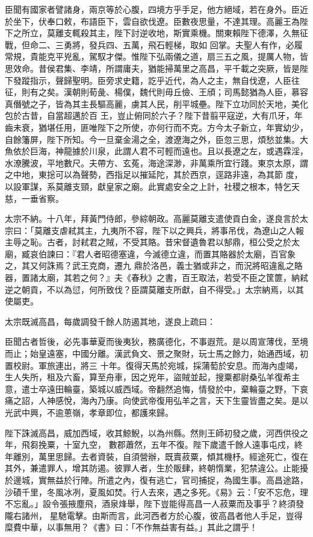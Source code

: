 \begin{pinyinscope}
 臣聞有國家者譬諸身，兩京等於心腹，四境方乎手足，他方絕域，若在身外。臣近於坐下，伏奉口敕，布語臣下，雲自欲伐遼。臣數夜思量，不達其理。高麗王為陛下之所立，莫離支輒殺其主，陛下討逆收地，斯實乘機。關東賴陛下德澤，久無征戰，但命二、三勇將，發兵四、五萬，飛石輕梯，取如
 回掌。夫聖人有作，必履常規，貴能克平兇亂，駕馭才傑。惟陛下弘兩儀之道，扇三五之風，提厲人物，皆思效命。昔侯君集、李靖，所謂庸夫，猶能掃萬里之高昌，平千載之突厥，皆是陛下發蹤指示，聲歸聖明。臣旁求史籍，訖乎近代，為人之主，無自伐遼，人臣往征，則有之矣。漢朝則荀彘、楊僕，魏代則毋丘儉、王頎；司馬懿猶為人臣，慕容真僭號之子，皆為其主長驅高麗，虜其人民，削平城壘。陛下立功同於天地，美化包於古昔，自當超邁於百
 王，豈止俯同於六子？陛下昔翦平寇逆，大有爪牙，年齒未衰，猶堪任用，匪唯陛下之所使，亦何行而不克。方今太子新立，年實幼少，自餘籓屏，陛下所知。今一旦棄金湯之全，渡遼海之外，臣忽三思，煩愁並集。大魚依於巨海，神龍據於川泉，此謂人君不可輕而遠也。且以長遼之左，或遇霖淫，水潦騰波，平地數尺。夫帶方、玄菟，海途深渺，非萬乘所宜行踐。東京太原，謂之中地，東捴可以為聲勢，西指足以摧延陀，其於西京，逕路非遠，為其節
 度，以設軍謀，系莫離支頸，獻皇家之廟。此實處安全之上計，社稷之根本，特乞天慈，一垂省察。



 太宗不納。十八年，拜黃門侍郎，參綜朝政。高麗莫離支遣使貢白金，遂良言於太宗曰：「莫離支虐弒其主，九夷所不容，陛下以之興兵，將事吊伐，為遼山之人報主辱之恥。古者，討弒君之賊，不受其賂。昔宋督遺魯君以郜鼎，桓公受之於太廟，臧哀伯諫曰：『君人者昭德塞違，今滅德立違，而置其賂器於太廟，百官象之，其又何誅焉？武王克商，遷九
 鼎於洛邑，義士猶或非之，而況將昭違亂之賂器，置諸太廟，其若之何？』夫《春秋》之書，百王取法，若受不臣之筐篚，納弒逆之朝貢，不以為愆，何所致伐？臣謂莫離支所獻，自不得受。」太宗納焉，以其使屬吏。



 太宗既滅高昌，每歲調發千餘人防遏其地，遂良上疏曰：



 臣聞古者哲後，必先事華夏而後夷狄，務廣德化，不事遐荒。是以周宣薄伐，至境而止；始皇遠塞，中國分離。漢武負文、景之聚財，玩士馬之餘力，始通西域，初置校尉。軍旅連出，將三
 十年。復得天馬於宛城，採蒲萄於安息。而海內虛竭，生人失所，租及六畜，算至舟車，因之兇年，盜賊並起，搜粟都尉桑弘羊復希主意，遣士卒遠田輪臺，築城以威西域。帝翻然追悔，情發於中，棄輪臺之野，下哀痛之詔，人神感悅，海內乃康。向使武帝復用弘羊之言，天下生靈皆盡之矣。是以光武中興，不逾蔥嶺，孝章即位，都護來歸。



 陛下誅滅高昌，威加西域，收其鯨鯢，以為州縣。然則王師初發之歲，河西供役之年，飛芻挽粟，十室九空，
 數郡蕭然，五年不復。陛下歲遣千餘人遠事屯戍，終年離別，萬里思歸。去者資裝，自須營辦，既賣菽粟，傾其機杼。經途死亡，復在其外，兼遣罪人，增其防遏。彼罪人者，生於販肆，終朝惰業，犯禁違公。止能擾於邊城，實無益於行陣。所遣之內，復有逃亡，官司捕捉，為國生事。高昌途路，沙磧千里，冬風冰冽，夏風如焚。行人去來，遇之多死。《易》云：「安不忘危，理不忘亂。」設令張掖塵飛，酒泉烽舉，陛下豈能得高昌一人菽粟而及事乎？終須發隴右諸州，
 星馳電擊。由斯而言，此河西者方於心腹，彼高昌者他人手足，豈得糜費中華，以事無用？《書》曰：「不作無益害有益。」其此之謂乎！




\end{pinyinscope}
